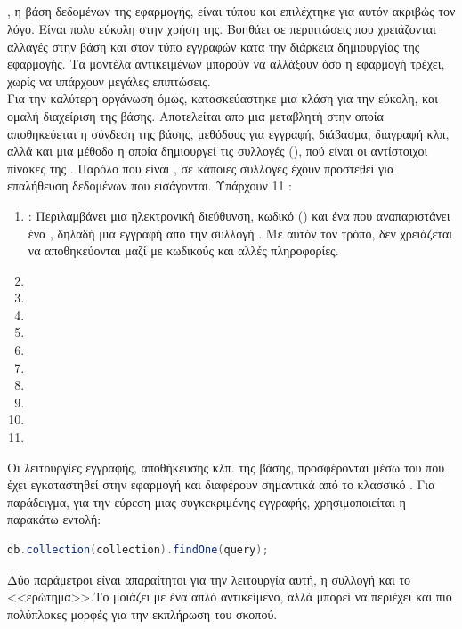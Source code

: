 \subsection{}
\pSpace{}, η βάση δεδομένων της εφαρμογής, είναι τύπου  και επιλέχτηκε για αυτόν ακριβώς τον λόγο. Είναι πολυ εύκολη στην χρήση της. Βοηθάει σε περιπτώσεις που χρειάζονται αλλαγές στην βάση και στον τύπο εγγραφών κατα την διάρκεια δημιουργίας της εφαρμογής. Τα μοντέλα αντικειμένων μπορούν να αλλάξουν όσο η εφαρμογή τρέχει, χωρίς να υπάρχουν μεγάλες επιπτώσεις.\\
\pSpace Για την καλύτερη οργάνωση όμως, κατασκεύαστηκε μια κλάση  για την εύκολη, και ομαλή διαχείριση της βάσης. Αποτελείται απο μια μεταβλητή στην οποία αποθηκεύεται η σύνδεση της βάσης,  μεθόδους για εγγραφή, διάβασμα, διαγραφή κλπ, αλλά και μια μέθοδο η οποία δημιουργεί τις συλλογές (), πού είναι οι αντίστοιχοι πίνακες της . Παρόλο που είναι , σε κάποιες συλλογές έχουν προστεθεί  για επαλήθευση δεδομένων που εισάγονται. Υπάρχουν 11 :\\
\begin{enumerate}
	\item {}: Περιλαμβάνει μια ηλεκτρονική διεύθυνση, κωδικό () και ένα  που αναπαριστάνει ένα , δηλαδή μια εγγραφή απο την συλλογή . Με αυτόν τον τρόπο, δεν χρειάζεται να αποθηκεύονται μαζί με κωδικούς και αλλές πληροφορίες.
	\item {}
	\item {}
	\item {}
	\item {}
	\item {}
	\item {}
	\item {}
	\item {}
	\item {}
	\item {}
\end{enumerate}
\pSpace Οι λειτουργίες εγγραφής, αποθήκευσης κλπ. της βάσης, προσφέρονται μέσω του  που έχει εγκαταστηθεί στην εφαρμογή και διαφέρουν σημαντικά από το κλασσικό . Για παράδειγμα, για την εύρεση μιας συγκεκριμένης εγγραφής, χρησιμοποιείται η παρακάτω εντολή:\\
	\begin{lstlisting}[language=Java]
	db.collection(collection).findOne(query);
	\end{lstlisting}
\pSpace Δύο παράμετροι είναι απαραίτητοι για την λειτουργία αυτή, η συλλογή και το <<ερώτημα>>.Το  μοιάζει με ένα απλό  αντικείμενο, αλλά μπορεί να περιέχει και πιο πολύπλοκες μορφές για την εκπλήρωση του σκοπού.

